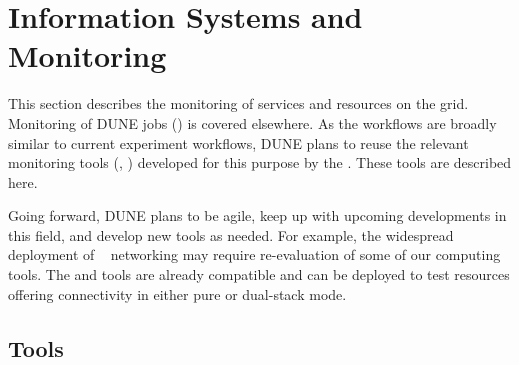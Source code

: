 \documentclass[../main-v1.tex]{subfiles}
\begin{document}
\chapter{Information Systems and Monitoring }
\label{ch:mon}

\FPadd\MonEtfTotalPeople\MonEtfOpsPeople\MonEtfDevPeople %

This section %
describes the monitoring of services and resources on the grid. %
Monitoring of DUNE jobs () is covered elsewhere.  As the workflows are broadly similar to current  experiment workflows, DUNE plans to reuse the relevant monitoring tools (, ) developed for this purpose by the . %
These tools are described here. 

Going forward, DUNE plans to be agile, keep up with upcoming developments in this field, and develop new tools as needed. For example, the widespread deployment of ~\cite{bib:ipv6TaskForce} networking may require re-evaluation of some of our computing tools.  The  and  tools are already  compatible and can be deployed to test resources offering  connectivity in either pure or dual-stack mode.

\section{Tools}
\label{sec:mon:xyz}  %
\end{document}
